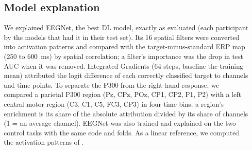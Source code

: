 \subsection{Model explanation}
\label{sec:explain-methods}
We explained EEGNet, the best DL model, exactly as evaluated (each participant by the models that had it in their test set). Its 16 spatial filters were converted into activation patterns \citep{haufe2014} and compared with the target-minus-standard ERP map (250 to 600~ms) by spatial correlation; a filter's importance was the drop in test AUC when it was removed. Integrated Gradients \citep{sundararajan2017} (64 steps, baseline the training mean) attributed the logit difference of each correctly classified target to channels and time points. To separate the P300 from the right-hand response, we compared a parietal P300 region (Pz, CPz, POz, CP1, CP2, P1, P2) with a left central motor region (C3, C1, C5, FC3, CP3) in four time bins; a region's enrichment is its share of the absolute attribution divided by its share of channels (1 = an average channel). EEGNet was also trained and explained on the two control tasks with the same code and folds. As a linear reference, we computed the activation patterns of .
